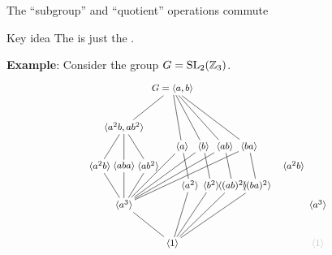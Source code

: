 \documentclass[8pt]{beamer}
\newcommand{\Pause}{}      %
\begin{document}

\begin{frame}{The ``subgroup'' and ``quotient'' operations commute} 
  
  \begin{alertblock}{Key idea}
    The  is just the .
  \end{alertblock}

  \medskip\Pause
  
  \textbf{Example}: Consider the group $G=\operatorname{SL}_2(\mathbb{Z}_3)$.
  \[
  \hspace*{-2mm}
  \begin{tikzpicture}[node distance=1cm,shorten >= -2pt, shorten <= -2pt,scale=.6]
    \begin{scope}[shift={(0,0)}]
      \tikzstyle{every node}=[font=\footnotesize]
      \node (1) {$\<1\>$};
      \node (a3) at (-2.5,2) {$\<a^3\>$};
      \node (a2) at (.9,3) {$\<a^2\>$};
      \node (b2) at (2,3) {$\<b^2\>$};
      \node (abab) at (3.1,3) {$\<(ab)^2\>$};
      \node (baba) at (4.35,3) {$\<(ba)^2\>$};
      \node (a2b) at (-3.75,4) {$\<a^2b\>$};
      \node (aba) at (-2.5,4) {$\<aba\>$};
      \node (ab2) at (-1.25,4) {$\<ab^2\>$};
      \node (a) at (.5,5) {$\<a\>$};
      \node (b) at (1.6,5) {$\<b\>$};
      \node (ab) at (2.7,5) {$\<ab\>$};
      \node (ba) at (3.95,5) {$\<ba\>$};
      \node (a2b-ab2) at (-2.5,6) {$\<a^2b,ab^2\>$};
      \node (G) at (0,8) {$G=\<a,b\>$};
      \draw (1) -- (a3);
      \draw (1) -- (a2);
      \draw (1) -- (b2);
      \draw (1) -- (abab);
      \draw (1) -- (baba);
      \draw (a3) -- (a2b);
      \draw (a3) -- (aba);
      \draw (a3) -- (ab2);
      \draw (a3) -- (a);
      \draw (a3) -- (b);
      \draw (a3) -- (ab);
      \draw (a3) -- (ba);
      \draw (a2) -- (a);
      \draw (b2) -- (b);
      \draw (abab) -- (ab);
      \draw (baba) -- (ba);
      \draw (a2b) -- (a2b-ab2);
      \draw (aba) -- (a2b-ab2);
      \draw (ab2) -- (a2b-ab2);
      \draw (G) -- (a2b-ab2);
      \draw (G) -- (a);
      \draw (G) -- (b);
      \draw (G) -- (ab);
      \draw (G) -- (ba);
    \end{scope}
    \begin{scope}[shift={(10,0)}]
      \tikzstyle{every node}=[font=\footnotesize]
      \node (1) at (-2.5,0) {\color{faded}$\<1\>$};
      \node (a3) at (-2.5,2) {$\<a^3\>$};
      \node (a2b) at (-3.75,4) {$\<a^2b\>$};

\end{scope}
\end{tikzpicture}\]
\end{frame}
\end{document}
